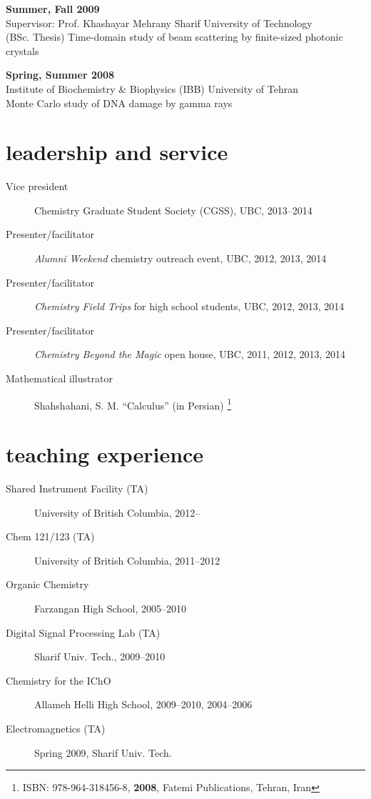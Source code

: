 \documentclass[overlapped,line,10pt,letterpaper]{res}
\begin{document}
\begin{resume}
\textbf{Summer, Fall 2009} \\
Supervisor: Prof. Khashayar Mehrany \hspace{\fill} Sharif University of Technology \\
(BSc. Thesis) Time-domain study of beam scattering by finite-sized photonic crystals

\textbf{Spring, Summer 2008} \\
Institute of Biochemistry \& Biophysics (IBB) \hspace{\fill} University of Tehran \\
Monte Carlo study of DNA damage by gamma rays

\section{leadership and service}
\begin{description}
\item[Vice president] Chemistry Graduate Student Society (CGSS), UBC, 2013–2014
\item[Presenter/facilitator] \emph{Alumni Weekend} chemistry outreach event, UBC, 2012, 2013, 2014
\item[Presenter/facilitator] \emph{Chemistry Field Trips} for high school students, UBC, 2012, 2013, 2014
\item[Presenter/facilitator] \emph{Chemistry Beyond the Magic} open house, UBC, 2011, 2012, 2013, 2014
\item[Mathematical illustrator] Shahshahani, S. M. ``Calculus'' (in Persian) \footnote{ ISBN: 978-964-318456-8, \textbf{2008}, Fatemi Publications, Tehran, Iran}
\end{description}

\section{teaching experience}
\begin{description}
\item[Shared Instrument Facility (TA)] University of British Columbia, 2012–
\item[Chem 121/123 (TA)] University of British Columbia, 2011–2012
\item[Organic Chemistry] Farzangan High School, 2005–2010
\item[Digital Signal Processing Lab (TA)] Sharif Univ. Tech., 2009–2010
\item[Chemistry for the IChO] Allameh Helli High School, 2009–2010, 2004–2006
\item[Electromagnetics (TA)] Spring 2009, Sharif Univ. Tech.
\end{description}


\end{resume}
\end{document}
